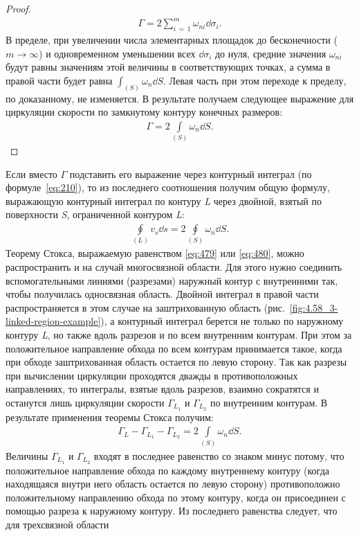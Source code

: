 \begin{proof}
		\begin{gather*}
			\Gamma = 2\sum_{i\,=\,1}^{m}\omega_{ni}\dd\sigma_i.
		\end{gather*}\n
		В пределе, при увеличении числа элементарных площадок до бесконечности ($m\rightarrow\infty$) и одновременном уменьшении всех $\dd\sigma_i$ до нуля, средние значения $\omega_{ni}$ будут равны значениям этой величины в соответствующих точках, а сумма в правой части будет равна $\int_{\left(S\right)}\omega_n\dd S$. Левая часть при этом переходе к пределу, по доказанному, не изменяется. В результате получаем следующее выражение для циркуляции скорости по замкнутому контуру конечных размеров:
		\begin{gather}
			\Gamma = 2 \int\limits_{\left(S\right)} \omega_n \dd S.\label{eq:479}
		\end{gather}
	\end{proof}
	Если вместо $\Gamma$ подставить его выражение через контурный интеграл (по формуле~\eqref{eq:210}), то из последнего соотношения получим общую формулу, выражающую контурный интеграл по контуру \textit{L} через двойной, взятый по поверхности \textit{S}, ограниченной контуром \textit{L}:
	\begin{gather}
		\oint\limits_{\left(L\right)} v_s\dd s = 2\oint\limits_{\left(S\right)}\omega_n\dd S.\label{eq:480}
	\end{gather}\n
	Теорему Стокса, выражаемую равенством \eqref{eq:479} или \eqref{eq:480}, можно распространить и на случай многосвязной области. Для этого нужно соединить вспомогательными линиями (разрезами) наружный контур с внутренними так, чтобы получилась односвязная область.\n
	Двойной интеграл в правой части распространяется в этом случае на заштрихованную область (рис.~\ref{fig:4.58_3-linked-region-example}), а контурный интеграл берется не только по наружному контуру \textit{L}, но также вдоль разрезов и по всем внутренним контурам. При этом за положительное направление обхода по всем контурам принимается такое, когда при обходе заштрихованная область остается по левую сторону.\n
	Так как разрезы при вычислении циркуляции проходятся дважды в противоположных направлениях, то интегралы, взятые вдоль разрезов, взаимно сократятся и останутся лишь циркуляции скорости $\Gamma_{L_1}$ и $\Gamma_{L_2}$ по внутренним контурам. В результате применения теоремы Стокса получим:
	\begin{gather*}
		\Gamma_L - \Gamma_{L_1} - \Gamma_{L_2} = 2\int\limits_{\left(S\right)}\omega_n\dd S.
	\end{gather*}
	Величины $\Gamma_{L_1}$ и $\Gamma_{L_2}$ входят в последнее равенство со знаком минус потому, что положительное направление обхода по каждому внутреннему контуру (когда находящаяся внутри него область остается по левую сторону) противоположно положительному направлению обхода по этому контуру, когда он присоединен с помощью разреза к наружному контуру. Из последнего равенства следует, что для трехсвязной области
